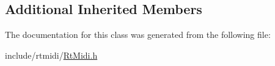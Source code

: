 \subsection*{Additional Inherited Members}


The documentation for this class was generated from the following file\+:\begin{DoxyCompactItemize}
\item 
include/rtmidi/\hyperlink{_rt_midi_8h}{Rt\+Midi.\+h}\end{DoxyCompactItemize}
